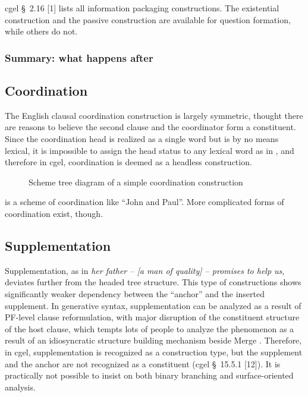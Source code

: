 \documentclass{article}
\newcommand*{\citesec}[1]{\S~{#1}}
\newcommand*{\corpus}[1]{\emph{#1}}
\begin{document}
\ac{cgel} \citesec{2.16} [1] lists all information packaging constructions.
The existential construction and the passive construction are available for question formation,
while others do not.

\subsubsection{Summary: what happens after }

\subsection{Coordination}

The English clausal coordination construction is largely symmetric, 
thought there are reasons to believe the second clause and the coordinator form a constituent.
Since the coordination head is realized as a single word but is by no means lexical,
it is impossible to assign the head status to any lexical word as in ,
and therefore in \ac{cgel}, coordination is deemed as a headless construction. %

\begin{figure}
    \centering
    
    \caption{Scheme tree diagram of a simple coordination construction}
    \label{fig:simple-coord}
\end{figure}

 is a scheme of coordination like ``John and Paul''.
More complicated forms of coordination exist, though.

\subsection{Supplementation}\label{sec:supplmentation}

Supplementation, as in \corpus{her father -- [a man of quality] -- promises to help us},
deviates further from the headed tree structure.
This type of constructions shows significantly weaker dependency 
between the ``anchor'' and the inserted supplement.
In generative syntax, supplementation can be analyzed as a result of PF-level clause reformulation,
with major disruption of the constituent structure of the host clause, 
which tempts lots of people to analyze the phenomenon 
as a result of an idiosyncratic structure building mechanism beside Merge \citep{ott2014ellipsis}.
Therefore, in \ac{cgel}, supplementation is recognized as a construction type,
but the supplement and the anchor are not recognized as a constituent (\ac{cgel} \citesec{15.5.1} [12]).
It is practically not possible to insist on both binary branching and surface-oriented analysis.
\end{document}
